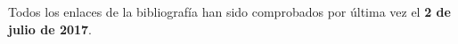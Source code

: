 \begin{thebibliography}{99}
	



\end{thebibliography}
Todos los enlaces de la bibliografía han sido comprobados por última vez el \textbf{2 de julio de 2017}.

